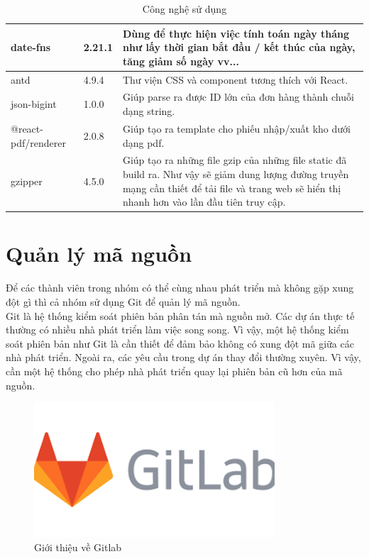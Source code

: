 \begin{table}[H]
\begin{tabular}{|l|l|m{20em}|}
			\hline
			date-fns & 2.21.1 & Dùng để thực hiện việc tính toán ngày tháng như lấy thời gian bắt đầu / kết thúc của ngày, tăng giảm số ngày vv... \\
			\hline
			antd & 4.9.4 &Thư viện CSS và component tương thích với React. \\
			\hline
			json-bigint & 1.0.0 &  Giúp parse ra được ID lớn của đơn hàng thành chuỗi dạng string. \\
			\hline
			@react-pdf/renderer & 2.0.8 & Giúp tạo ra template cho phiếu nhập/xuất kho dưới dạng pdf. \\
			\hline
			gzipper & 4.5.0 & Giúp tạo ra những file gzip của những file static đã build ra. Như vậy sẽ giảm dung lượng đường truyền mạng cần thiết để tải file và trang web sẽ hiển thị nhanh hơn vào lần đầu tiên truy cập. \\
			\hline
		\end{tabular}
		\caption{Công nghệ sử dụng}
	\end{table}


 


\section{Quản lý mã nguồn}
	
	Để các thành viên trong nhóm có thể cùng nhau phát triển mà không gặp xung đột gì thì cả nhóm sử dụng Git để quản lý mã nguồn.\\
	
	Git là hệ thống kiểm soát phiên bản phân tán mà nguồn mở. Các dự án thực tế thường có nhiều nhà phát triển làm việc song song. Vì vậy, một hệ thống kiểm soát phiên bản như Git là cần thiết để đảm bảo không có xung đột mã giữa các nhà phát triển. Ngoài ra, các yêu cầu trong dự án thay đổi thường xuyên. Vì vậy, cần một hệ thống cho phép nhà phát triển quay lại phiên bản cũ hơn của mã nguồn.
	
	\begin{figure}[H]
		\includegraphics[width=0.8\textwidth]{Images/gitlab.png}
		\centering
		\linebreak
		\caption{Giới thiệu về Gitlab}
	\end{figure}
	
